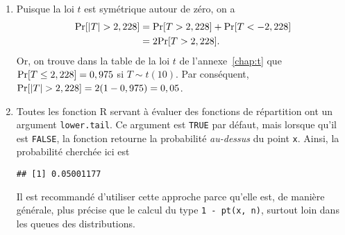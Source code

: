 \begin{solution}{2.11}
    \begin{enumerate}
    \item Puisque la loi $t$ est symétrique autour de zéro, on a
      \begin{align*}
        \mathrm{Pr} [ \lvert T \rvert > 2,228 ]
        &= \mathrm{Pr} [ T > 2,228 ] + \mathrm{Pr} [ T < -2,228 ] \\
        &= 2 \mathrm{Pr} [ T > 2,228 ].
      \end{align*}
      Or, on trouve dans la table de la loi $t$ de
      l'annexe~\ref{chap:t} que $\mathrm{Pr} [ T \leq 2,228 ] = 0,975$ si $T
      \sim t(10)$. Par conséquent, $\mathrm{Pr} [ \lvert T \rvert > 2,228 ] = 2 (1 -
      0,975) = 0,05$.
    \item Toutes les fonction \textsf{R} servant à évaluer des
      fonctions de répartition ont un argument \texttt{lower.tail}. Ce
      argument est \texttt{TRUE} par défaut, mais lorsque qu'il est
      \texttt{FALSE}, la fonction retourne la probabilité
      \emph{au-dessus} du point \texttt{x}. Ainsi, la probabilité
      cherchée ici est
\begin{knitrout}
\color{fgcolor}\begin{kframe}
\begin{alltt}
 \hlopt{*} \hlstd{(}\hlstd{,} \hlstd{,}  \hlstd{=} \hlstd{)}
\end{alltt}
\begin{verbatim}
## [1] 0.05001177
\end{verbatim}
\end{kframe}
\end{knitrout}
      Il est recommandé d'utiliser cette approche parce qu'elle est,
      de manière générale, plus précise que le calcul du type
      \verb|1 - pt(x, n)|, surtout loin dans les queues des
      distributions.
    \end{enumerate}
  
\end{solution}
